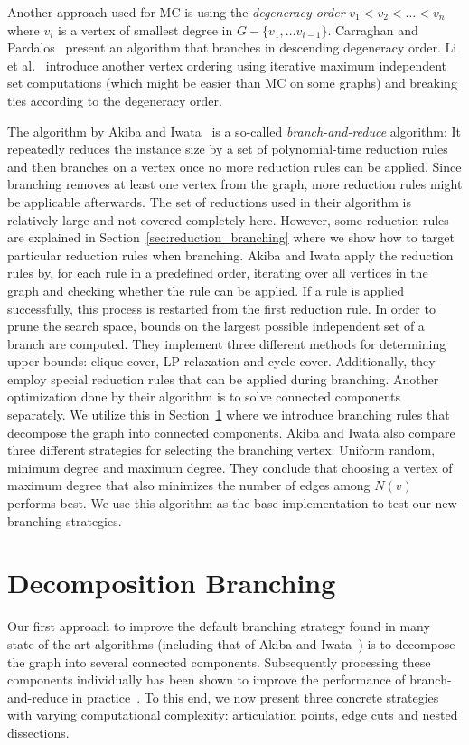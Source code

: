 \documentclass[a4paper,UKenglish,cleveref, autoref, thm-restate]{lipics-v2021}
\begin{document}
Another approach used for MC is using the \emph{degeneracy order} $v_1 < v_2 <
\dots < v_n$ where $v_i$ is a vertex of smallest degree in $G - \{v_1, \dots
v_{i-1}\}$. Carraghan and Pardalos~\cite{CarraghanPardalos} present an algorithm
that branches in descending degeneracy order. Li et al.~\cite{LiFangXu}
introduce another vertex ordering using iterative maximum independent set
computations (which might be easier than MC on some graphs) and breaking ties
according to the degeneracy order.


The algorithm by Akiba and Iwata~\cite{AkibaIwata} is a so-called
\emph{branch-and-reduce} algorithm: It repeatedly reduces the instance size by a
set of polynomial-time reduction rules and then branches on a vertex once no
more reduction rules can be applied. Since branching removes at least one vertex
from the graph, more reduction rules might be applicable afterwards. The
set of reductions used in their algorithm is relatively large and not covered
completely here. However, some reduction rules are explained in
Section~\ref{sec:reduction_branching} where we show how to target particular reduction
rules when branching. Akiba and Iwata apply the reduction rules by, for each
rule in a predefined order, iterating over all
vertices in the graph and checking whether the rule
can be applied. If a rule is applied successfully, this process is
restarted from the first reduction rule. In order to prune the search space, bounds on the largest
possible independent set of a branch are computed. They implement three different
methods for determining upper bounds: clique cover, LP relaxation and cycle
cover. Additionally, they employ special reduction rules that can be applied
during branching. Another optimization done by their algorithm is to solve
connected components separately. We utilize this in
Section~\ref{sec:decomposition_branching} where we introduce branching rules
that decompose the graph into connected components. Akiba and Iwata also
compare three different strategies for
selecting the branching vertex: Uniform random, minimum degree and maximum
degree. They conclude that choosing a vertex of maximum degree that also
minimizes the number of edges among $N(v)$ performs best. We use this algorithm
as the base implementation to test our new branching strategies.

\section{Decomposition Branching}\label{sec:decomposition_branching}
Our first approach to improve the default branching strategy found in many state-of-the-art algorithms (including that of Akiba and Iwata~\cite{AkibaIwata}) is to decompose the graph into several connected components.
Subsequently processing these components individually has been shown to improve the performance of branch-and-reduce in practice~\cite{alsahafy2020computing}.
To this end, we now present three concrete strategies with varying computational
complexity: articulation points, edge cuts and nested dissections.
\end{document}
